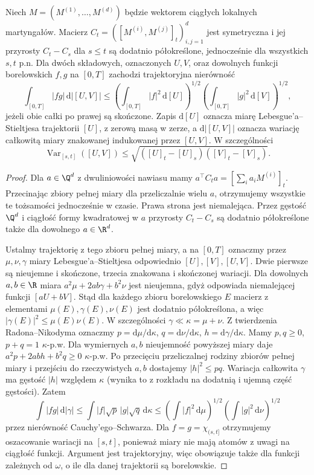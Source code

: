 \begin{twierdzenie}
\label{thm:kunita-watanabe}
Niech $M=(M^{(1)},\ldots,M^{(d)})$ będzie
wektorem ciągłych lokalnych martyngałów.
Macierz $C_t=([M^{(i)},M^{(j)}]_t)_{i,j=1}^d$
jest symetryczna i jej przyrosty $C_t-C_s$
dla $s\le t$ są dodatnio półokreślone,
jednocześnie dla wszystkich $s,t$ p.n.
Dla dwóch składowych, oznaczonych $U,V$, oraz
dowolnych funkcji borelowskich $f,g$ na $[0,T]$
zachodzi trajektoryjna nierówność
\[
\int_{[0,T]} |fg|\,\mathrm d|[U,V]|
\le
\left(\int_{[0,T]} |f|^2\,\mathrm d[U]\right)^{1/2}
\left(\int_{[0,T]} |g|^2\,\mathrm d[V]\right)^{1/2},
\]
jeżeli obie całki po prawej są skończone.
Zapis $\mathrm d[U]$ oznacza miarę Lebesgue'a--Stieltjesa
trajektorii $[U]$, z zerową masą w zerze, a
$\mathrm d|[U,V]|$ oznacza wariację całkowitą
miary znakowanej indukowanej przez $[U,V]$.
W szczególności
\[
\operatorname{Var}_{[s,t]}([U,V])
\le\sqrt{([U]_t-[U]_s)([V]_t-[V]_s)}.
\]
\end{twierdzenie}
\begin{proof}
Dla $a\in\Q^d$ z dwuliniowości nawiasu mamy
$a^\top C_t a=[\sum_i a_i M^{(i)}]_t$.
Przecinając zbiory pełnej miary dla przeliczalnie
wielu $a$, otrzymujemy wszystkie te tożsamości
jednocześnie w czasie. Prawa strona jest
niemalejąca. Przez gęstość $\Q^d$ i ciągłość
formy kwadratowej w $a$ przyrosty $C_t-C_s$
są dodatnio półokreślone także dla dowolnego
$a\in\R^d$.

Ustalmy trajektorię z tego zbioru pełnej miary,
a na $[0,T]$ oznaczmy przez $\mu,\nu,\gamma$
miary Lebesgue'a--Stieltjesa odpowiednio
$[U],[V],[U,V]$. Dwie pierwsze są nieujemne
i skończone, trzecia znakowana i skończonej
wariacji. Dla dowolnych $a,b\in\R$ miara
$a^2\mu+2ab\gamma+b^2\nu$ jest nieujemna,
gdyż odpowiada niemalejącej funkcji $[aU+bV]$.
Stąd dla każdego zbioru borelowskiego $E$
macierz z elementami $\mu(E),\gamma(E),\nu(E)$
jest dodatnio półokreślona, a więc
$|\gamma(E)|^2\le\mu(E)\nu(E)$.
W szczególności $\gamma\ll\kappa=\mu+\nu$.
Z twierdzenia Radona--Nikodyma oznaczmy
$p=\mathrm d\mu/\mathrm d\kappa$,
$q=\mathrm d\nu/\mathrm d\kappa$,
$h=\mathrm d\gamma/\mathrm d\kappa$.
Mamy $p,q\ge0$, $p+q=1$ $\kappa$-p.w.
Dla wymiernych $a,b$ nieujemność powyższej
miary daje $a^2p+2abh+b^2q\ge0$ $\kappa$-p.w.
Po przecięciu przeliczalnej rodziny zbiorów
pełnej miary i przejściu do rzeczywistych $a,b$
dostajemy $|h|^2\le pq$.
Wariacja całkowita $\gamma$ ma gęstość $|h|$
względem $\kappa$ (wynika to z rozkładu na
dodatnią i ujemną część gęstości).
Zatem
\[
\int|fg|\,\mathrm d|\gamma|
\le\int |f|\sqrt p\,|g|\sqrt q\,\mathrm d\kappa
\le
\left(\int|f|^2\,\mathrm d\mu\right)^{1/2}
\left(\int|g|^2\,\mathrm d\nu\right)^{1/2}
\]
przez nierówność Cauchy'ego--Schwarza.
Dla $f=g=\chi_{(s,t]}$ otrzymujemy oszacowanie
wariacji na $[s,t]$, ponieważ miary nie mają atomów
z uwagi na ciągłość funkcji.
Argument jest trajektoryjny, więc obowiązuje
także dla funkcji zależnych od $\omega$,
o ile dla danej trajektorii są borelowskie.
\end{proof}

